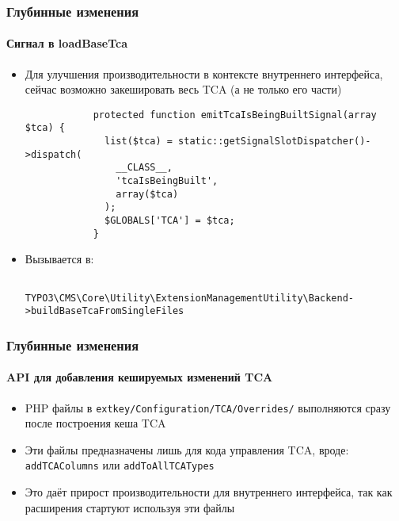 \begin{frame}[fragile]
	\frametitle{Глубинные изменения}
	\framesubtitle{Сигнал в loadBaseTca}

	\lstset{
		basicstyle=\tiny\ttfamily
	}

	\begin{itemize}
		\item Для улучшения производительности в контексте внутреннего интерфейса, сейчас возможно закешировать весь TCA (а не
		только его части)

		\begin{lstlisting}
			protected function emitTcaIsBeingBuiltSignal(array $tca) {
			  list($tca) = static::getSignalSlotDispatcher()->dispatch(
			    __CLASS__,
			    'tcaIsBeingBuilt',
			    array($tca)
			  );
			  $GLOBALS['TCA'] = $tca;
			}
		\end{lstlisting}

		\item Вызывается в:

			\begin{lstlisting}
				TYPO3\CMS\Core\Utility\ExtensionManagementUtility\Backend->buildBaseTcaFromSingleFiles
			\end{lstlisting}

	\end{itemize}

\end{frame}  


\begin{frame}[fragile]
	\frametitle{Глубинные изменения}
	\framesubtitle{API для добавления кешируемых изменений TCA}

	\begin{itemize}
		\item PHP файлы в \texttt{extkey/Configuration/TCA/Overrides/}
			выполняются сразу после построения кеша TCA

		\item Эти файлы предназначены лишь для кода управления TCA,\newline
			вроде: \texttt{addTCAColumns} или \texttt{addToAllTCATypes}

		\item Это даёт прирост производительности для внутреннего интерфейса, так как расширения стартуют используя эти файлы

	\end{itemize}

\end{frame} 

